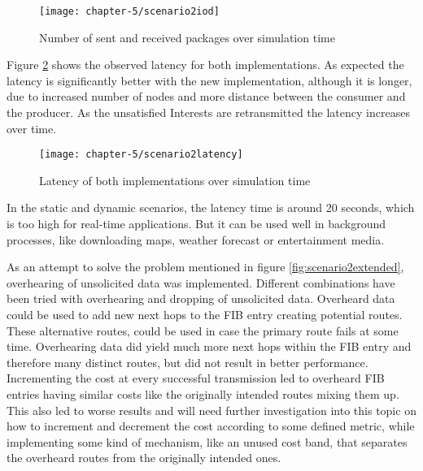 \clearpage

\begin{figure}[H]
  \centering
  \texttt{[image: chapter-5/scenario2iod]}
  \caption{Number of sent and received packages over simulation time}
  \label{fig:scenario2iod}
\end{figure}

\vspace{5mm} %

Figure \ref{fig:scenario2latency} shows the observed latency for both implementations. As expected the latency is significantly better with the new implementation, although it is longer, due to increased number of nodes and more distance between the consumer and the producer. As the unsatisfied Interests are retransmitted the latency increases over time.

\vspace{5mm} %

\begin{figure}[H]
  \centering
  \texttt{[image: chapter-5/scenario2latency]}
  \caption{Latency of both implementations over simulation time}
  \label{fig:scenario2latency}
\end{figure}

\vspace{5mm} %

In the static and dynamic scenarios, the latency time is around 20 seconds, which is too high for real-time applications. But it can be used well in background processes, like downloading maps, weather forecast or entertainment media.

As an attempt to solve the problem mentioned in figure \ref{fig:scenario2extended}, overhearing of unsolicited data was implemented. Different combinations have been tried with overhearing and dropping of unsolicited data. Overheard data could be used to add new next hops to the FIB entry creating potential routes. These alternative routes, could be used in case the primary route fails at some time. Overhearing data did yield much more next hops within the FIB entry and therefore many distinct routes, but did not result in better performance. Incrementing the cost at every successful transmission led to overheard FIB entries having similar costs like the originally intended routes mixing them up. This also led to worse results and will need further investigation into this topic on how to increment and decrement the cost according to some defined metric, while implementing some kind of mechanism, like an unused cost band, that separates the overheard routes from the originally intended ones.


